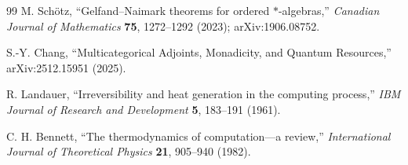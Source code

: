 \documentclass[11pt]{article}
\begin{document}
\begin{thebibliography}{99}
M. Sch\"otz, ``Gelfand--Naimark theorems for ordered $*$-algebras,'' \emph{Canadian Journal of Mathematics} \textbf{75}, 1272--1292 (2023); arXiv:1906.08752.

S.-Y. Chang, ``Multicategorical Adjoints, Monadicity, and Quantum Resources,'' arXiv:2512.15951 (2025).


R. Landauer, ``Irreversibility and heat generation in the computing process,'' \emph{IBM Journal of Research and Development} \textbf{5}, 183--191 (1961).

C. H. Bennett, ``The thermodynamics of computation---a review,'' \emph{International Journal of Theoretical Physics} \textbf{21}, 905--940 (1982).
\end{thebibliography}
\end{document}
